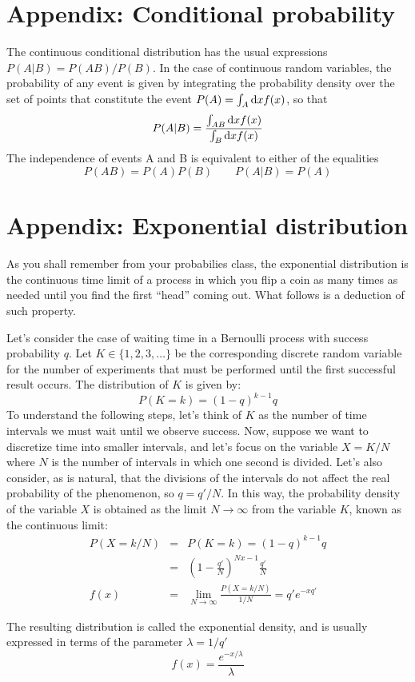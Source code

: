 \section*{Appendix: Conditional probability}
The continuous conditional distribution has the usual expressions $P(A|B) = P(A B)/P(B)$. In the case of continuous random variables, the probability of any event is given by integrating the probability density over the set of points that constitute the event $P(A) = \int_A \mathrm{d} x f(x)$, so that
\[
P(A|B) = \frac{\int_{A B} \mathrm{d} x f(x)}{\int_B\mathrm{d} x f(x)}
\]
The independence of events A and B is equivalent to either of the equalities
\[ P(A B) =P(A) P(B) \qquad P(A|B ) = P(A) \]



\section*{Appendix: Exponential distribution}


As you shall remember from your probabilies class, the exponential distribution is the continuous time limit of a process in which you flip a coin as many times as needed until you find the first ``head'' coming out. What follows is a deduction of such property.

Let's consider the case of waiting time in a Bernoulli process with success probability $q$. Let $K\in \{1,2,3,\ldots\}$ be the corresponding discrete random variable for the number of experiments that must be performed until the first successful result occurs. The distribution of $K$ is given by:
\[ P(K=k) = (1-q)^{k-1} q
\]
To understand the following steps, let's think of $K$ as the number of time intervals we must wait until we observe success. Now, suppose we want to discretize time into smaller intervals, and let's focus on the variable $X = K/N$ where $N$ is the number of intervals in which one second is divided. Let's also consider, as is natural, that the divisions of the intervals do not affect the real probability of the phenomenon, so $q=q'/N$. In this way, the probability density of the variable $X$ is obtained as the limit $N\to \infty$ from the variable $K$, known as the continuous limit:
\begin{eqnarray*}
 P(X = k/N) &=& P(K=k) = (1-q)^{k-1} q \\
	    &=&  (1-\frac{q'}{N})^{N x-1} \frac{q'}{N} \\
f(x) &=& \lim_{N\to\infty} \frac{P(X = k/N)}{1/N}	=  q' e^{-x q'}
\end{eqnarray*}

The resulting distribution is called the exponential density, and is usually expressed in terms of the parameter $\lambda = 1/{q'}$
\[f(x) = \frac{e^{-x/\lambda}}{\lambda}
\]




